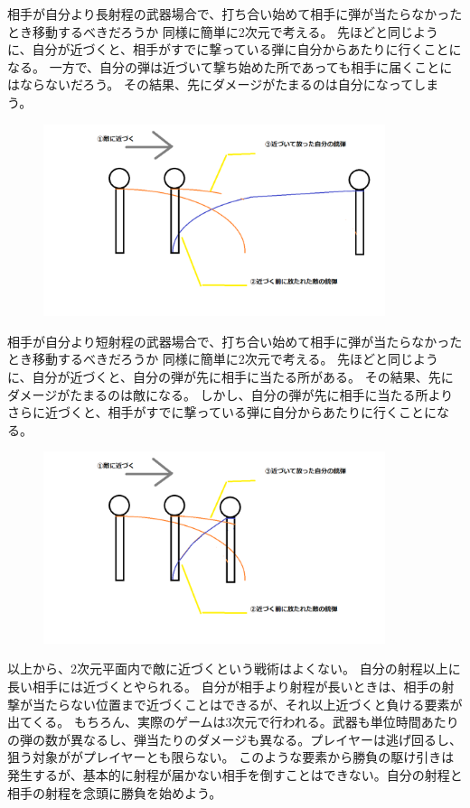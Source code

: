 \documentclass[a4paper,11pt]{jsbook}
\begin{document}
相手が自分より長射程の武器場合で、打ち合い始めて相手に弾が当たらなかったとき移動するべきだろうか
同様に簡単に2次元で考える。
先ほどと同じように、自分が近づくと、相手がすでに撃っている弾に自分からあたりに行くことになる。
一方で、自分の弾は近づいて撃ち始めた所であっても相手に届くことにはならないだろう。
その結果、先にダメージがたまるのは自分になってしまう。
\begin{figure}[h]
  \begin{center}
    \includegraphics[width=10cm]{resoource/long_range_attacking.png}
  \end{center}
\end{figure}


相手が自分より短射程の武器場合で、打ち合い始めて相手に弾が当たらなかったとき移動するべきだろうか
同様に簡単に2次元で考える。
先ほどと同じように、自分が近づくと、自分の弾が先に相手に当たる所がある。
その結果、先にダメージがたまるのは敵になる。
しかし、自分の弾が先に相手に当たる所よりさらに近づくと、相手がすでに撃っている弾に自分からあたりに行くことになる。

\begin{figure}[h]
  \begin{center}
    \includegraphics[width=10cm]{resoource/short_range_attacking.png}
  \end{center}
\end{figure}

以上から、2次元平面内で敵に近づくという戦術はよくない。
自分の射程以上に長い相手には近づくとやられる。
自分が相手より射程が長いときは、相手の射撃が当たらない位置まで近づくことはできるが、それ以上近づくと負ける要素が出てくる。
もちろん、実際のゲームは3次元で行われる。武器も単位時間あたりの弾の数が異なるし、弾当たりのダメージも異なる。プレイヤーは逃げ回るし、狙う対象ががプレイヤーとも限らない。
このような要素から勝負の駆け引きは発生するが、基本的に射程が届かない相手を倒すことはできない。自分の射程と相手の射程を念頭に勝負を始めよう。
\end{document}
